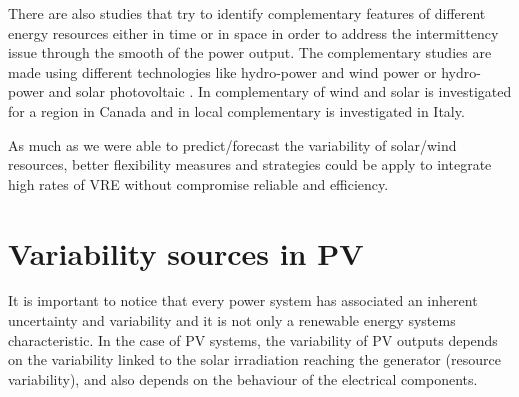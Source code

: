 
There are also studies that try to identify complementary features of different energy resources either in time or in space in order to address the intermittency issue through the smooth of the power output. The complementary studies are made using different technologies like hydro-power and wind power \cite*{Denault2009, Silva2016} or hydro-power and solar photovoltaic \cite*{Francois2016, Beluco2012, Kougias2016}. In \cite*{Hoicka2011} complementary of wind and solar is investigated for a region in Canada and in \cite*{Monforti2014} local complementary is investigated in Italy.


As much as we were able to predict/forecast the variability of solar/wind resources, better flexibility measures and strategies could be apply to integrate high rates of VRE without compromise reliable and efficiency. 
\section{Variability sources in PV}

It is important to notice that every power system has associated an inherent uncertainty and variability and it is not only a renewable energy systems characteristic. In the case of PV systems, the variability of PV outputs depends on the variability linked to the solar irradiation reaching the generator (resource variability), and also depends on the behaviour of the electrical components.  


